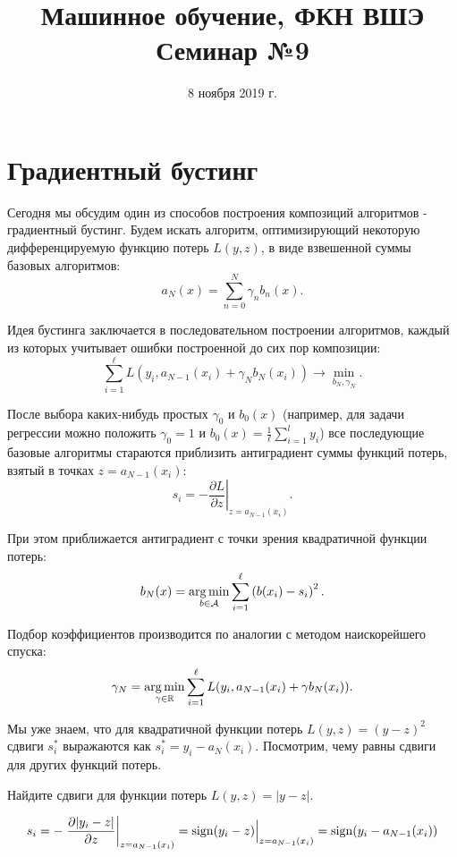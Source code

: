 \documentclass[12pt,fleqn]{article}
\title{Машинное обучение, ФКН ВШЭ\\Семинар №9}
\author{}
\date{8 ноября 2019 г.}
\begin{document}
\maketitle


\section{Градиентный бустинг}

Сегодня мы обсудим один из способов построения композиций алгоритмов - градиентный бустинг. Будем искать алгоритм, оптимизирующий некоторую дифференцируемую функцию потерь $L(y, z)$, в виде взвешенной суммы базовых алгоритмов:
\[
    a_N(x)
    =
    \sum_{n = 0}^{N}
        \gamma_n b_n(x).
\]

Идея бустинга заключается в последовательном построении алгоритмов, каждый из которых учитывает ошибки построенной до сих пор композиции:
\[
    \sum_{i = 1}^{\ell}
        L(y_i, a_{N - 1}(x_i) + \gamma_N b_N(x_i))
    \to
    \min_{b_N, \gamma_N}.
\]

После выбора каких-нибудь простых $\gamma_0$ и $b_0(x)$ (например, для задачи регрессии можно положить $\gamma_0 = 1$ и $b_0(x) = \frac 1\ell \sum_{i=1}^l y_i$) все последующие базовые алгоритмы стараются приблизить антиградиент суммы функций потерь, взятый в точках $z = a_{N - 1}(x_i)$:
\[
    s_i
    =
    -
    \left.
    \frac{\partial L}{\partial z}
    \right|_{z = a_{N - 1}(x_i)}.
\]

При этом приближается антиградиент с точки зрения квадратичной функции потерь:
\[
    b_N(x)
    =
    \mathop{\rm arg\,min}\limits_{b \in \mathcal{A}}
        \sum_{i = 1}^{\ell}
            \left(
                b(x_i) - s_i
            \right)^2.
\]

Подбор коэффициентов производится по аналогии с методом наискорейшего спуска:
\[
    \gamma_N = \mathop{\rm arg\,min}\limits_{\gamma \in \mathbb{R}}\sum_{i=1}^{\ell} L(y_i, a_{N-1}(x_i) + 
        \gamma b_N (x_i)).
\]

Мы уже знаем, что для квадратичной функции потерь $L(y, z) = 
(y - z)^2$ сдвиги $s_i^*$ выражаются как $s_i^* = y_i - a_N(x_i)$. Посмотрим, 
чему равны сдвиги для других функций потерь.

\begin{vkProblem}
Найдите сдвиги для функции потерь $L(y, z) = |y - z|$.
\end{vkProblem}
\begin{esSolution}

\[
    s_i = - \left. \frac{\partial |y_i - z|}{\partial 
        z} \right|_{z=a_{N-1}(x_i)} = 
    \Bigl. \mathop{\rm sign}\limits(y_i - z) \Bigr|_{z=a_{N-1}(x_i)} =
    \mathop{\rm sign}\limits(y_i - a_{N-1}(x_i))
\]

\end{esSolution}
\end{document}
